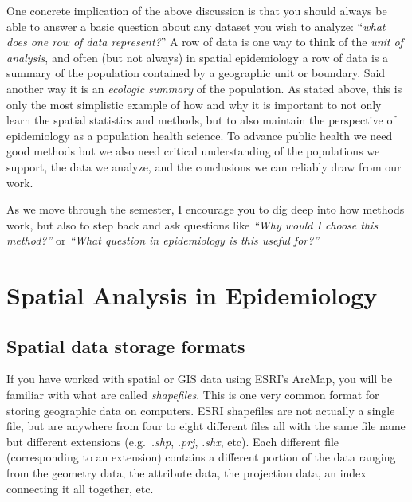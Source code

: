 \documentclass[
]{book}
\begin{document}
One concrete implication of the above discussion is that you should always be able to answer a basic question about any dataset you wish to analyze: ``\emph{what does one row of data represent?}'' A row of data is one way to think of the \emph{unit of analysis}, and often (but not always) in spatial epidemiology a row of data is a summary of the population contained by a geographic unit or boundary. Said another way it is an \emph{ecologic summary} of the population. As stated above, this is only the most simplistic example of how and why it is important to not only learn the spatial statistics and methods, but to also maintain the perspective of epidemiology as a population health science. To advance public health we need good methods but we also need critical understanding of the populations we support, the data we analyze, and the conclusions we can reliably draw from our work.

As we move through the semester, I encourage you to dig deep into how methods work, but also to step back and ask questions like \emph{``Why would I choose this method?''} or \emph{``What question in epidemiology is this useful for?''}

\hypertarget{spatial-analysis-in-epidemiology}{%
\section{Spatial Analysis in Epidemiology}\label{spatial-analysis-in-epidemiology}}

\hypertarget{spatial-data-storage-formats}{%
\subsection{Spatial data storage formats}\label{spatial-data-storage-formats}}

If you have worked with spatial or GIS data using ESRI's ArcMap, you will be familiar with what are called \emph{shapefiles}. This is one very common format for storing geographic data on computers. ESRI shapefiles are not actually a single file, but are anywhere from four to eight different files all with the same file name but different extensions (e.g.~\emph{.shp}, \emph{.prj}, \emph{.shx}, etc). Each different file (corresponding to an extension) contains a different portion of the data ranging from the geometry data, the attribute data, the projection data, an index connecting it all together, etc.
\end{document}
